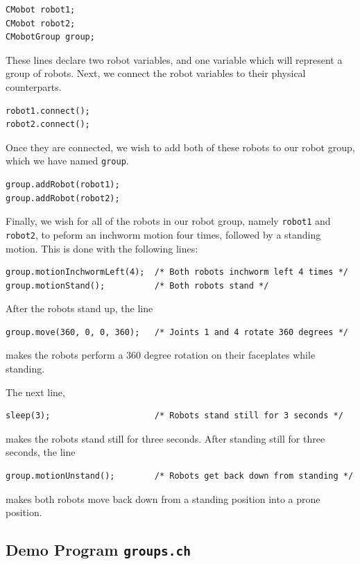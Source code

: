 \documentclass{article}
\begin{document}
\begin{verbatim}
CMobot robot1;
CMobot robot2;
CMobotGroup group;
\end{verbatim}

These lines declare two robot variables, and one variable which
will represent a group of robots. Next, we connect the robot
variables to their physical counterparts.

\begin{verbatim}
robot1.connect();
robot2.connect();
\end{verbatim}

Once they are connected, we wish to add both of these robots to our robot group,
which we have named \texttt{group}.

\begin{verbatim}
group.addRobot(robot1);
group.addRobot(robot2);
\end{verbatim}

Finally, we wish for all of the robots in our robot group, namely
\texttt{robot1} and \texttt{robot2}, to peform an inchworm motion four times, followed
by a standing motion. This is done with the following lines:

\begin{verbatim}
group.motionInchwormLeft(4);  /* Both robots inchworm left 4 times */
group.motionStand();          /* Both robots stand */
\end{verbatim}

After the robots stand up, the line
\begin{verbatim}
group.move(360, 0, 0, 360);   /* Joints 1 and 4 rotate 360 degrees */
\end{verbatim}
makes the robots perform a 360 degree rotation on their faceplates
while standing.

The next line, 
\begin{verbatim}
sleep(3);                     /* Robots stand still for 3 seconds */
\end{verbatim}
makes the robots stand still for three seconds. After standing
still for three seconds, the line
\begin{verbatim}
group.motionUnstand();        /* Robots get back down from standing */
\end{verbatim}
makes both robots move back down from a standing position into a prone
position.

\subsection{Demo Program \texttt{groups.ch}}
\end{document}
